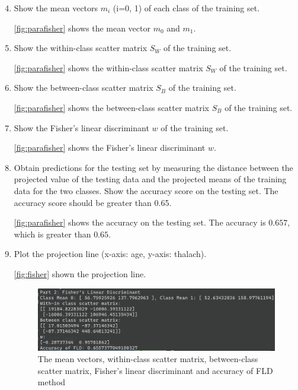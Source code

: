 \documentclass[twocolumn]{extarticle}
\begin{document}
\begin{enumerate}
\setcounter{enumi}{3}
\item Show the mean vectors $m_i$ (i=0, 1) of each class of the training set.

\autoref{fig:parafisher} shows the mean vector $m_0$ and $m_1$.

\item Show the within-class scatter matrix $S_W$ of the training set.

\autoref{fig:parafisher} shows the within-class scatter matrix $S_W$ of the training set.

\item Show the between-class scatter matrix $S_B$ of the training set.

\autoref{fig:parafisher} shows the between-class scatter matrix $S_B$ of the training set.

\item Show the Fisher's linear discriminant $w$ of the training set.

\autoref{fig:parafisher} shows the Fisher's linear discriminant $w$.

\item Obtain predictions for the testing set by measuring the distance between the projected value of the testing data and the projected means of the training data for the two classes. Show the accuracy score on the testing set. The accuracy score should be greater than 0.65.

\autoref{fig:parafisher} shows the accuracy on the testing set. The accuracy is $0.657$, which is greater than $0.65$.

\item Plot the projection line (x-axis: age, y-axis: thalach).

\autoref{fig:fisher} shown the projection line.

\begin{figure}[H]
\centering
\includegraphics[width=0.95\linewidth]{para_fisher}
\caption{The mean vectors, within-class scatter matrix, between-class scatter matrix, Fisher's linear discriminant and accuracy of FLD method}
\label{fig:parafisher}
\end{figure}



\end{enumerate}
\end{document}
